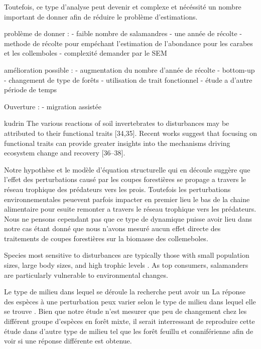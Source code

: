 Toutefois, ce type d'analyse peut devenir et complexe et nécéssité un nombre important de donner afin de réduire le problème d'estimations. 

problème  de donner : 
- faible nombre de salamandres
- une année de récolte
- methode de récolte pour empéchant l'estimation de l'abondance pour les carabes et les collemboles
- complexité demander par le SEM

amélioration possible : 
- augmentation du nombre d'année de récolte
- bottom-up
- changement de type de forêts
- utilisation de trait fonctionnel
- étude a d'autre période de temps

Ouverture :
- migration assistée


kudrin The various reactions of soil invertebrates to disturbances may be attributed to their functional traits [34,35]. 
Recent works suggest that focusing on functional traits can provide greater insights into the mechanisms driving ecosystem change and recovery [36–38].


Notre hypothèse et le modèle d'équation structurelle qui en découle suggère que l'effet des perturbations causé par les coupes forestières se propage a travers le réseau trophique des prédateurs vers les prois. 
Toutefois les perturbations environnementales peuevent parfois impacter en premier lieu le bas de la chaine alimentaire pour esuite remonter a travers le réseau trophique vers les prédateurs. 
Nous ne pensons cependant pas que ce type de dynamique puisse avoir lieu dans notre cas étant donné que nous n'avons mesuré aucun effet directe des traitements de coupes forestières sur la biomasse des collemeboles. 

Species most sensitive to disturbances are typically those with small population sizes, large body sizes, and high trophic levels \citep{Seibold2015Associationextinction,Nolte2019Habitatspecialization,Hagge2021Whatdoes}. 
As top consumers, salamanders are particularly vulnerable to environmental changes. 


Le type de milieu dans lequel se déroule la recherche peut avoir un 
La réponse des espèces à une perturbation peux varier selon le type de milieu dans lequel elle se trouve \citep{Kudrin2023metaanalysiseffects}. 
Bien que notre étude n'est mesurer que peu de changement chez les différent groupe d'espèces en forêt mixte, 
il serait interressant de reproduire cette étude dans d'autre type de milieu tel que les forêt feuillu et conniférienne afin de voir si une réponse différente est obtenue. 


